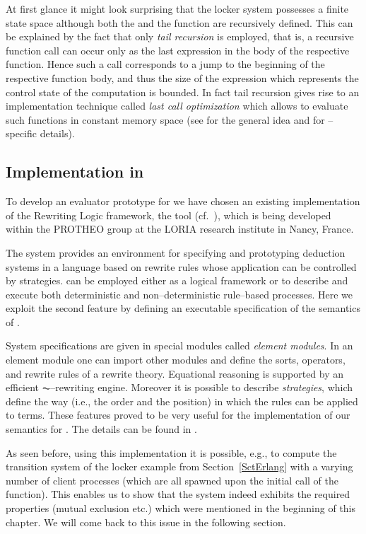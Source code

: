 \documentclass{entcs}
\begin{document}
At first glance it might look surprising that the locker system possesses a
finite state space although both the  and the 
function are recursively defined. This can be explained by the fact that only
\emph{tail recursion} is employed, that is, a recursive function call can
occur only as the last expression in the body of the respective function.
Hence such a call corresponds to a jump to the beginning of the respective
function body, and thus the size of the expression which represents the
control state of the computation is bounded. In fact tail recursion gives
rise to an implementation technique called \emph{last call optimization} which
allows to evaluate such functions in constant memory space (see \cite{Ste77} for the general idea and
\cite[Sct.~9.1]{AVWW96} for \Erlang--specific details).

\subsection{Implementation in \ELAN}

To develop an evaluator prototype for \Erlang we have chosen an 
existing implementation of the Rewriting
Logic framework, the \ELAN tool (cf.\ \cite{ELAN}), which is being developed
within the PROTHEO group at the LORIA research institute in Nancy, France.

The \ELAN system provides an environment for specifying and prototyping
deduction systems in a language based on rewrite rules whose application can
be controlled by strategies. \ELAN can be employed either as a logical
framework or to describe and execute both deterministic and non--deterministic
rule--based processes. Here we exploit the second feature by defining an
executable specification of the semantics of \Erlang.

System specifications are given in special \ELAN modules called \emph{element
modules}. In an element module one can import other modules and define the
sorts, operators, and rewrite rules of a rewrite theory. Equational reasoning
is supported by an efficient $\AC$--rewriting engine. Moreover it is possible
to describe \emph{strategies}, which define the way (i.e., the order and the
position) in which the rules can be applied to terms. These features proved
to be very useful for the implementation of our semantics for \Erlang. The
details can be found in \cite{Ami02}.

As seen before,
using this implementation it is possible, e.g., to compute the transition
system of the locker example from Section~\ref{SctErlang} with a varying
number of client processes (which are all spawned upon the initial call of the
 function). This enables us to show that the system indeed
exhibits the required properties (mutual exclusion etc.) which were mentioned
in the beginning of this chapter. We will come back to this issue in the 
following section.
\end{document}
